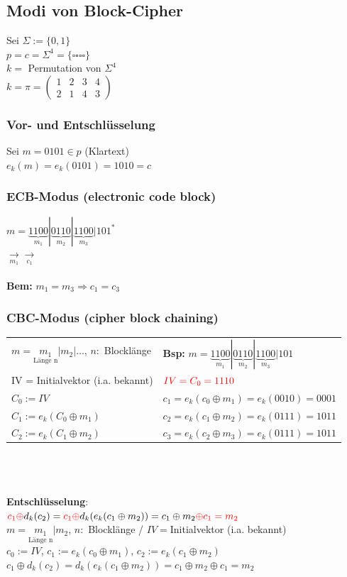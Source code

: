 \documentclass[10pt]{article}
\newcommand{\Bold}[1]{\textbf{#1}} %
\newcommand{\T}[1]{\text{#1}} %
\newcommand{\Ra}{\Rightarrow}
\newcommand{\Array}[2]{\left(\begin{array}{#1}#2\end{array}\right)} %
\newcommand{\Unten}[2]{\underset{#1}{#2}} %
\begin{document}
\subsection{Modi von Block-Cipher}
Sei $\Sigma:=\{0,1\}$\\ 
$p=c=\Sigma^4=\{\square\square\square\square\}$\\
$k=$ Permutation von $\Sigma^4$\\
$k=\pi=\Array{cccc}{1&2&3&4\\2&1&4&3}$\\
\subsubsection*{Vor- und Entschlüsselung}
Sei $m=0101\in p$ (Klartext)\\ 
$e_k(m)=e_k(0101)=1010=c$
\subsubsection{ECB-Modus (electronic code block)}
 $m=\underbrace{1100}_{m_1}|\underbrace{0110}_{m_2}|\underbrace{1100}_{m_3}|101^*$\\
 $\Unten{m_1}{\longrightarrow}$$\Unten{c_1}{\longrightarrow}$\\
 \\
 \Bold{Bem:} $m_1=m_3\Ra c_1=c_3$
\subsubsection{CBC-Modus (cipher block chaining)}
\begin{tabular}{p{7.5cm}  l}
	$m=\Unten{\T{Länge n}}{m_1}|m_2|\dots$, $n:$ Blocklänge &\Bold{Bsp:} $m=\underbrace{1100}_{m_1} | \underbrace{0110}_{m_2} | \underbrace{1100}_{m_3} | 101$ \\
	{\color{red}IV = Initialvektor} (i.a. bekannt) &  $\color{red}IV=C_0=1110$  \\
	$C_0 := IV$ & $c_1 = e_k(c_0 \oplus m_1) = e_k(0010) = 0001$ \\
	$C_1 := e_k(C_0 \oplus m_1)$ & $c_2 = e_k(c_1 \oplus m_2) = e_k(0111) = 1011$ \\
	$C_2 := e_k(C_1 \oplus m_2)$  & $c_3 = e_k(c_2 \oplus m_3) = e_k(0111) = 1011$ \\
\end{tabular} \\ \\ \\
 \textbf{Entschlüsselung}:  \\
 ${\color{red}c_1\oplus} d_k(c_2)={\color{red}c_1\oplus}d_k(e_k(c_1\oplus m_2))= c_1\oplus m_2 {\color{red}\oplus c_1 = m_2}$ \\
 $m=\Unten{\T{Länge n}}{m_1}|m_2$, $n:$ Blocklänge / $IV=$Initialvektor (i.a. bekannt)\\
 $c_0:=IV$, $c_1:=e_k(c_0\oplus m_1)$, $c_2:=e_k(c_1\oplus m_2)$\\
 $c_1\oplus d_k(c_2)=d_k(e_k(c_1\oplus m_2))=c_1\oplus m_2\oplus c_1=m_2$\\
\end{document}
